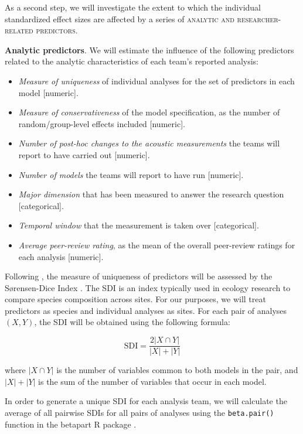 \documentclass[Review,times,sageh]{sagej}
\providecommand{\tightlist}{\setlength{\itemsep}{0pt}\setlength{\parskip}{0pt}}
\begin{document}
As a second step, we will investigate the extent to which the individual standardized effect sizes are affected by a series of \textsc{analytic and researcher-related predictors}.

\textbf{Analytic predictors}. We will estimate the influence of the following predictors related to the analytic characteristics of each team's reported analysis:

\begin{itemize}
\tightlist
\item
  \emph{Measure of uniqueness} of individual analyses for the set of predictors in each model {[}numeric{]}.
\item
  \emph{Measure of conservativeness} of the model specification, as the number of random/group-level effects included {[}numeric{]}.
\item
  \emph{Number of post-hoc changes to the acoustic measurements} the teams will report to have carried out {[}numeric{]}.
\item
  \emph{Number of models} the teams will report to have run {[}numeric{]}.
\item
  \emph{Major dimension} that has been measured to answer the research question {[}categorical{]}.
\item
  \emph{Temporal window} that the measurement is taken over {[}categorical{]}.
\item
  \emph{Average peer-review rating}, as the mean of the overall peer-review ratings for each analysis {[}numeric{]}.
\end{itemize}

Following \citet{Parker2020}, the measure of uniqueness of predictors will be assessed by the Sørensen-Dice Index \citep[SDI,][]{dice1945, sorensen1948}.
The SDI is an index typically used in ecology research to compare species composition across sites.
For our purposes, we will treat predictors as species and individual analyses as sites.
For each pair of analyses \((X, Y)\), the SDI will be obtained using the following formula:

\[\text{SDI} = \frac{2|X \cap Y|}{|X|+|Y|}\]

where \(|X \cap Y|\) is the number of variables common to both models in the pair, and \(|X|+|Y|\) is the sum of the number of variables that occur in each model.

In order to generate a unique SDI for each analysis team, we will calculate the average of all pairwise SDIs for all pairs of analyses using the \texttt{beta.pair()} function in the betapart R package \citep{baselga2020}.
\end{document}
